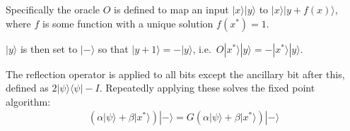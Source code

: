 \documentclass[]{article}
\newcommand{\bra}[1]{\langle #1 |}
\newcommand{\ket}[1]{| #1 \rangle}
\begin{document}
Specifically the oracle $O$ is defined to map an input $\ket{x}\ket{y}$ to $\ket{x}\ket{y+f(x)}$, where $f$ is some function with a unique solution $f(x^*) = 1$.

$\ket{y}$ is then set to $\ket{-}$ so that $\ket{y+1} = -\ket{y}$, i.e.\ $O\ket{x^*}\ket{y} = -\ket{x^*}\ket{y}$.

The reflection operator is applied to all bits except the ancillary bit after this, defined as $2\ket{\psi}\bra{\psi}-I$. Repeatedly applying these solves the fixed point algorithm:
\begin{align*}
(\alpha\ket{\psi} + \beta\ket{x^*})\ket{-} = G(\alpha\ket{\psi}+\beta\ket{x^*})\ket{-}
\end{align*}
\end{document}
